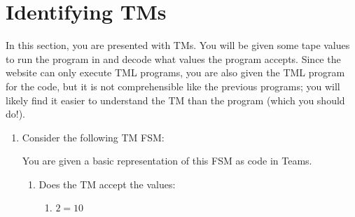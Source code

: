 \documentclass[answers]{exam}
\begin{document}
    \newpage

    \section{Identifying TMs}
    In this section, you are presented with TMs. You will be given some tape values to run the program in and decode what values the program accepts. Since the website can only execute TML programs, you are also given the TML program for the code, but it is not comprehensible like the previous programs; you will likely find it easier to understand the TM than the program (which you should do!). 
    \begin{enumerate}
        \item Consider the following TM FSM:
        \begin{figure}[H]
            \centering
        \end{figure}
        You are given a basic representation of this FSM as code in Teams.
        \begin{enumerate}
            \item Does the TM accept the values:
            \begin{enumerate}
                \item $2 = 10$
                \begin{solution}
                    
                \end{solution}
                

\end{enumerate}
\end{enumerate}
\end{enumerate}
\end{document}
